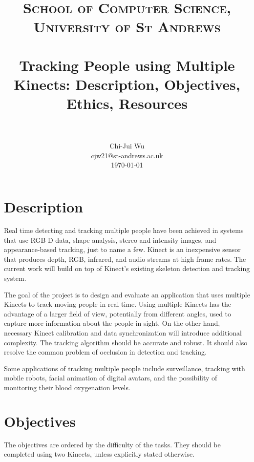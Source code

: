 \documentclass[paper=a4, fontsize=11pt]{scrartcl}
\title{
		\vspace{-7ex}
		\usefont{OT1}{bch}{b}{n}
		\normalfont \normalsize \textsc{School of Computer Science, University of St Andrews} \\ [25pt]
		\horrule{0.5pt} \\[0.2cm]
		\huge Tracking People using Multiple Kinects: Description, Objectives, Ethics, Resources \\
		\horrule{2pt} \\[0.2cm]
		\vspace{-2ex}
}
\author{
		\normalfont \normalsize
        Chi-Jui Wu\\[-3pt] \normalsize
        {cjw21@st-andrews.ac.uk}\\[-3pt] \normalsize
        \today
}
\date{}
\numberwithin{equation}{section}
\numberwithin{figure}{section}
\numberwithin{table}{section}
\begin{document}
\maketitle

\section{Description}

Real time detecting and tracking multiple people have been achieved in systems that use RGB-D data\cite{track_rgbd}, shape analysis, stereo and intensity images\cite{w4s}, and appearance-based tracking\cite{track_robust}, just to name a few. Kinect is an inexpensive sensor that produces depth, RGB, infrared, and audio streams at high frame rates. The current work will build on top of Kinect's existing skeleton detection and tracking system.

The goal of the project is to design and evaluate an application that uses multiple Kinects to track moving people in real-time. Using multiple Kinects has the advantage of a larger field of view, potentially from different angles, used to capture more information about the people in sight. On the other hand, necessary Kinect calibration and data synchronization will introduce additional complexity. The tracking algorithm should be accurate and robust. It should also resolve the common problem of occlusion in detection and tracking.

Some applications of tracking multiple people include surveillance\cite{surveillance}, tracking with mobile robots\cite{mobile}, facial animation of digital avatars\cite{facial_animation}, and the possibility of monitoring their blood oxygenation levels.

\section{Objectives}

The objectives are ordered by the difficulty of the tasks. They should be completed using two Kinects, unless explicitly stated otherwise.
\end{document}
